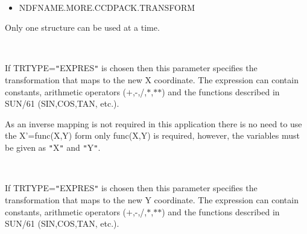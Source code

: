 \documentclass[twoside,11pt]{article}
\renewcommand{\_}{\texttt{\symbol{95}}}
\newcommand{\qt}[1]{{\tt "}#1{\tt "}}
\newcommand{\sstsubsection}[1]{ \item[{#1}] \mbox{} \\}
\newcommand{\sstitemlist}[1]{
  \mbox{} \\
  \vspace{-3.5ex}
  \begin{itemize}
     #1
  \end{itemize}
}
\newcommand{\sstitem}{\item}
\newcommand{\sstsubsection}[1]{\item[{#1}]}
\newcommand{\sstitemlist}[1]{
      \begin{itemize}
         #1
      \end{itemize}
      \\
   }
\newcommand{\sstitem}{\item}
\begin{document}
{{{         \sstitemlist{

            \sstitem
                NDF\_NAME.MORE.CCDPACK.TRANSFORM

         }
         Only one structure can be used at a time.
      }
      \sstsubsection{
         XFOR = LITERAL (Read)
      }{
         If TRTYPE=\qt{EXPRES} is chosen then this parameter specifies the
         transformation that maps to the new X coordinate. The
         expression can contain constants, arithmetic operators
         ($+$,-,/,$*$,$*$$*$) and the functions described in SUN/61
         (SIN,COS,TAN, etc.).

         As an inverse mapping is not required in this application
         there is no need to use the X'=func(X,Y) form only func(X,Y)
         is required, however, the variables must be given as
         \qt{X} and \qt{Y}.
      }
      \sstsubsection{
         YFOR = LITERAL (Read)
      }{
         If TRTYPE=\qt{EXPRES} is chosen then this parameter specifies the
         transformation that maps to the new Y coordinate. The
         expression can contain constants, arithmetic operators
         ($+$,-,/,$*$,$*$$*$) and the functions described in SUN/61
         (SIN,COS,TAN, etc.).

}}}
\end{document}
